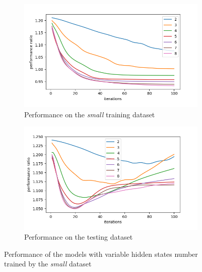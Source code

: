 \documentclass[thesis=M,english]{FITthesis}[2012/10/20]
\begin{document}
\begin{figure}
\centering
\begin{subfigure}{1\textwidth}
  \centering
  \includegraphics[width=1\linewidth]{img/ex5/small_train.png}
  \caption{Performance on the \textit{small} training dataset}
  \label{fig:smtrain}
\end{subfigure}
\begin{subfigure}{1\textwidth}
  \centering
  \includegraphics[width=1\linewidth]{img/ex5/small_test.png}
  \caption{Performance on the testing dataset}
  \label{fig:smtest}
\end{subfigure}
\caption{Performance of the models with variable hidden states number trained by the \textit{small} dataset}
\label{fig:sm}
\end{figure}
\end{document}
